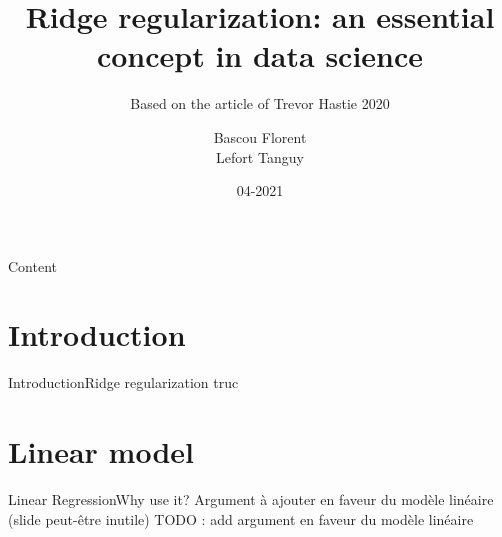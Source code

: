 \documentclass[10pt,aspectratio=43]{beamer}
\title[] %
{Ridge regularization: an essential concept in data science} %
\subtitle{Based on the article of Trevor Hastie 2020}
\date{04-2021} %
\author[]%
{%
    {Bascou Florent} \\%
	{Lefort Tanguy}%
}
\institute[
]
{%
    University of Montpellier
}
\begin{document}
\maketitle


\begin{frame}{Content}{}
    \tableofcontents
\end{frame}


\section*{Introduction}
\begin{frame}{Introduction}{Ridge regularization}
truc
\end{frame}


\section{Linear model}

\begin{frame}{Linear Regression}{Why use it?}
    Argument à ajouter en faveur du modèle linéaire (slide peut-être inutile)
    TODO : add argument en faveur du modèle linéaire
\end{frame}
\end{document}
